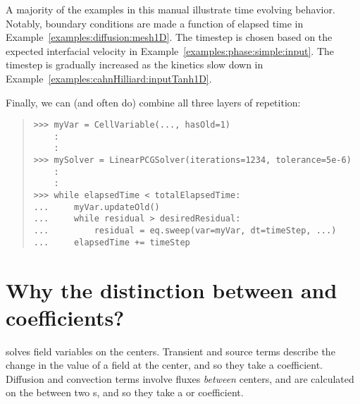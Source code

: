 \begin{description}
        A majority of the examples in this manual illustrate time
        evolving behavior. Notably, boundary conditions are made a
        function of elapsed time in
        Example~\ref{examples:diffusion:mesh1D}. The timestep is
        chosen based on the expected interfacial velocity in
        Example~\ref{examples:phase:simple:input}. The timestep is
        gradually increased as the kinetics slow down in
        Example~\ref{examples:cahnHilliard:inputTanh1D}.
    
    \end{description}
    
    Finally, we can (and often do) combine all three layers of repetition:
    \begin{quote}
\begin{verbatim}
>>> myVar = CellVariable(..., hasOld=1)
    : 
    :
>>> mySolver = LinearPCGSolver(iterations=1234, tolerance=5e-6) 
    : 
    :
>>> while elapsedTime < totalElapsedTime:
...     myVar.updateOld()
...     while residual > desiredResidual:
...         residual = eq.sweep(var=myVar, dt=timeStep, ...)
...     elapsedTime += timeStep
\end{verbatim}
    \end{quote}

    \section{Why the distinction between  and
     coefficients?}  \FiPy{} solves field
    variables on the  centers.  Transient and source terms
    describe the change in the value of a field at the 
    center, and so they take a  coefficient.
    Diffusion and convection terms involve fluxes \emph{between}
     centers, and are calculated on the 
    between two s, and so they take a 
    or  coefficient.
    
